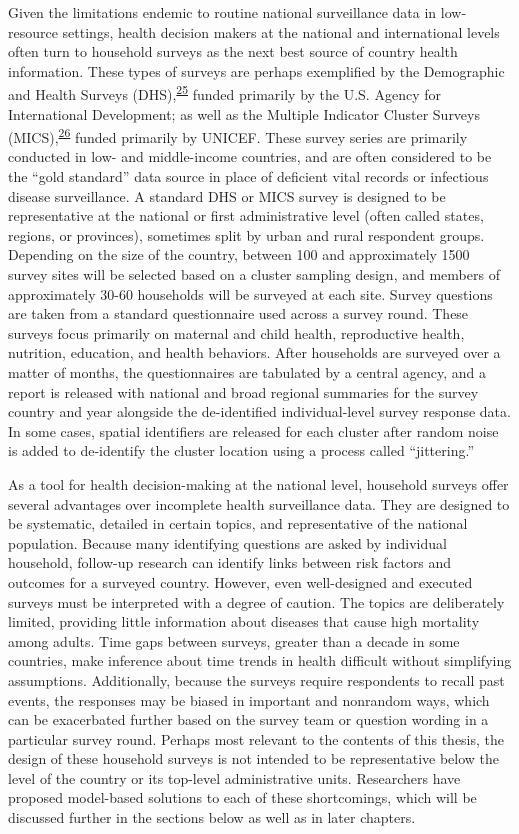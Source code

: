 \documentclass[
]{article}
\begin{document}
Given the limitations endemic to routine national surveillance data in low-resource settings, health decision makers at the national and international levels often turn to household surveys as the next best source of country health information. These types of surveys are perhaps exemplified by the Demographic and Health Surveys (DHS),\textsuperscript{\protect\hyperlink{ref-Corsi2012}{25}} funded primarily by the U.S. Agency for International Development; as well as the Multiple Indicator Cluster Surveys (MICS),\textsuperscript{\protect\hyperlink{ref-Khan2019}{26}} funded primarily by UNICEF. These survey series are primarily conducted in low- and middle-income countries, and are often considered to be the ``gold standard'' data source in place of deficient vital records or infectious disease surveillance. A standard DHS or MICS survey is designed to be representative at the national or first administrative level (often called states, regions, or provinces), sometimes split by urban and rural respondent groups. Depending on the size of the country, between 100 and approximately 1500 survey sites will be selected based on a cluster sampling design, and members of approximately 30-60 households will be surveyed at each site. Survey questions are taken from a standard questionnaire used across a survey round. These surveys focus primarily on maternal and child health, reproductive health, nutrition, education, and health behaviors. After households are surveyed over a matter of months, the questionnaires are tabulated by a central agency, and a report is released with national and broad regional summaries for the survey country and year alongside the de-identified individual-level survey response data. In some cases, spatial identifiers are released for each cluster after random noise is added to de-identify the cluster location using a process called ``jittering.''

As a tool for health decision-making at the national level, household surveys offer several advantages over incomplete health surveillance data. They are designed to be systematic, detailed in certain topics, and representative of the national population. Because many identifying questions are asked by individual household, follow-up research can identify links between risk factors and outcomes for a surveyed country. However, even well-designed and executed surveys must be interpreted with a degree of caution. The topics are deliberately limited, providing little information about diseases that cause high mortality among adults. Time gaps between surveys, greater than a decade in some countries, make inference about time trends in health difficult without simplifying assumptions. Additionally, because the surveys require respondents to recall past events, the responses may be biased in important and nonrandom ways, which can be exacerbated further based on the survey team or question wording in a particular survey round. Perhaps most relevant to the contents of this thesis, the design of these household surveys is not intended to be representative below the level of the country or its top-level administrative units. Researchers have proposed model-based solutions to each of these shortcomings, which will be discussed further in the sections below as well as in later chapters.
\end{document}
